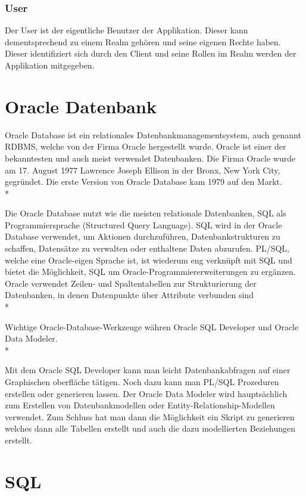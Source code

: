 \subsubsection{User}
Der User ist der eigentliche Benutzer der Applikation. Dieser kann dementsprechend zu einem Realm gehören und seine eigenen Rechte haben.
Dieser identifiziert sich durch den Client und seine Rollen im Realm werden der Applikation mitgegeben.


\section{Oracle Datenbank}
\author{David Ignjatovic}
Oracle Database ist ein relationales Datenbankmanagementsystem, auch genannt RDBMS, welche von der Firma Oracle hergestellt wurde. 
Oracle ist einer der bekanntesten und auch meist verwendet Datenbanken. Die Firma Oracle wurde am 17. August 1977 Lawrence Joseph Ellison in der Bronx, New York City, gegründet.
Die erste Version von Oracle Database kam 1979 auf den Markt. \cite{OracleDB} \\*

Die Oracle Database nutzt wie die meisten relationale Datenbanken, SQL als Programmiersprache (Structured Query Language).
SQL wird in der Oracle Database verwendet, um Aktionen durchzuführen, Datenbankstrukturen zu schaffen, Datensätze zu verwalten oder enthaltene Daten abzurufen. 
PL/SQL, welche eine Oracle-eigen Sprache ist, ist wiederum eng verknüpft mit SQL und bietet die Möglichkeit, SQL um Oracle-Programmiererweiterungen zu ergänzen. 
Oracle verwendet Zeilen- und Spaltentabellen zur Strukturierung der Datenbanken, in denen Datenpunkte über Attribute verbunden sind \cite{OracleDB} \\*

Wichtige Oracle-Database-Werkzeuge währen Oracle SQL Developer und Oracle Data Modeler. \\*

Mit dem Oracle SQL Developer kann man leicht Datenbankabfragen auf einer Graphischen oberfläche tätigen. Noch dazu kann man PL/SQL Prozeduren erstellen oder generieren lassen.
Der Oracle Data Modeler wird hauptsächlich zum Erstellen von Datenbankmodellen oder Entity-Relationship-Modellen verwendet. Zum Schluss hat man dann die Möglichkeit ein Skript 
zu generieren welches dann alle Tabellen erstellt und auch die dazu modellierten Beziehungen erstellt.

\section{SQL}
\author{David Ignjatovic}

